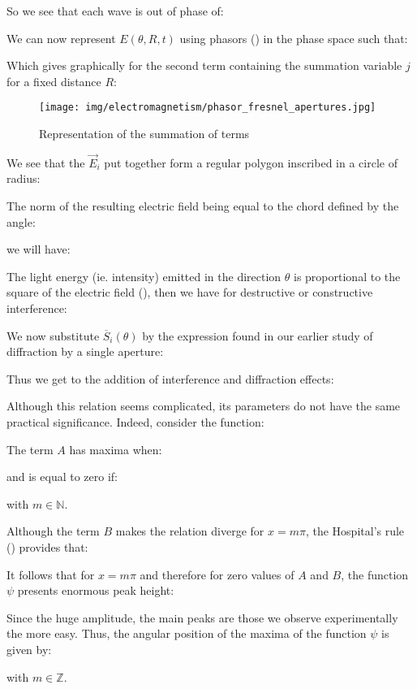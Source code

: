 	So we see that each wave is out of phase of:
	
	We can now represent $E(\theta,R,t)$ using phasors () in the phase space such that:
	
	Which gives graphically for the second term containing the summation variable $j$ for a fixed distance $R$:
	\begin{figure}[H]
		\centering
		\texttt{[image: img/electromagnetism/phasor\_fresnel\_apertures.jpg]}
		\caption[]{Representation of the summation of terms}
	\end{figure}
	We see that the $\vec{E}_i$ put together form a regular polygon inscribed in a circle of radius:
	
	The norm of the resulting electric field being equal to the chord defined by the angle:
	
 	we will have:
	
	The light energy (ie. intensity) emitted in the direction $\theta$ is proportional to the square of the electric field (), then we have for destructive or constructive interference:
	
	We now substitute $\overline{S}_i(\theta)$ by the expression found in our earlier study of diffraction by a single aperture:
	
	Thus we get to the addition of interference and diffraction effects:
	
	Although this relation seems complicated, its parameters do not have the same practical significance. Indeed, consider the function:
	
	The term $A$ has maxima when:
	
	and is equal to zero if:
	
	with $m\in \mathbb{N}$.
	
	Although the term $B$ makes the relation diverge for $x=m\pi$, the Hospital's rule () provides that:
	
	It follows that for $x=m\pi$ and therefore for zero values of $A$ and $B$, the function $\psi$ presents enormous peak height:
	
	Since the huge amplitude, the main peaks are those we observe experimentally the more easy. Thus, the angular position of the maxima of the function $\psi$ is given by:
	
	with $m\in\mathbb{Z}$.

